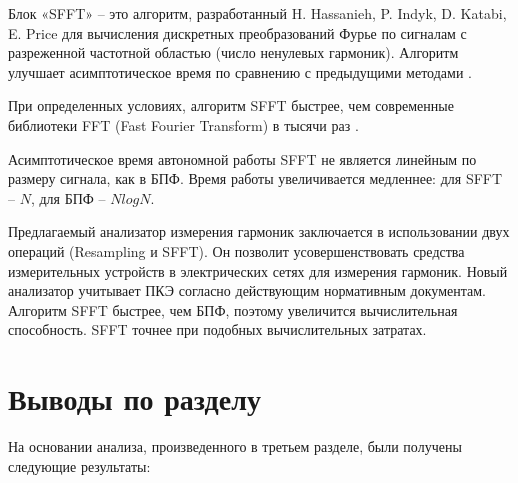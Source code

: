 Блок «SFFT» – это алгоритм, разработанный H. Hassanieh, P. Indyk, D. Katabi, E. Price для вычисления дискретных преобразований Фурье по сигналам с разреженной частотной областью (число ненулевых гармоник). Алгоритм улучшает асимптотическое время по сравнению с предыдущими методами \cite{hassanieh2012nearly, gilbert2002near}. 


При определенных условиях, алгоритм SFFT быстрее, чем современные библиотеки FFT (Fast Fourier Transform) в тысячи раз \cite {6986055, spiral}. 


Асимптотическое время автономной работы SFFT не является линейным по размеру сигнала, как в БПФ. Время работы увеличивается медленнее: для SFFT – $N$, для БПФ – $NlogN$.

Предлагаемый анализатор измерения гармоник заключается в использовании двух операций (Resampling и SFFT). Он позволит усовершенствовать средства измерительных устройств в электрических сетях для измерения гармоник. Новый анализатор учитывает ПКЭ согласно действующим нормативным документам. Алгоритм SFFT быстрее, чем БПФ, поэтому увеличится вычислительная способность. SFFT точнее при 
подобных вычислительных затратах. 

\section{Выводы по разделу} \label{sec:ch3/sect7}
На основании анализа, произведенного в третьем разделе, были получены следующие результаты:

